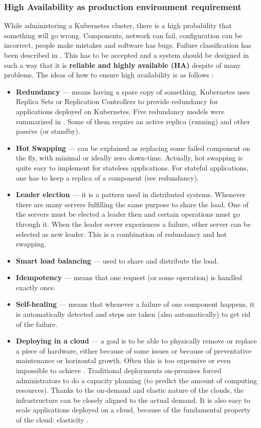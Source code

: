 \subsubsection{High Availability as production environment requirement}
While administering a Kubernetes cluster, there is a high probability that something will go wrong. Components, network can fail, configuration can be incorrect, people make mistakes and software has bugs. Failure classification has been described in \cite{article-failures}. This has to be accepted and a system should be designed in such a way that it is \textbf{reliable and highly available (HA)} despite of many problems. The ideas of how to ensure high availability is as follows \cite{book-mastering-k8s}:
\begin{itemize}
\item \textbf{Redundancy} --- means having a spare copy of something. Kubernetes uses Replica Sets or Replication Controllers to provide redundancy for applications deployed on Kubernetes. Five redundancy models were summarized in \cite{article-redundancy-models}. Some of them require an active replica (running) and other passive (or standby).
\item \textbf{Hot Swapping} --- can be explained as replacing some failed component on the fly, with minimal or ideally zero down-time. Actually, hot swapping is quite easy to implement for stateless applications. For stateful applications, one has to keep a replica of a component (see redundancy).
\item \textbf{Leader election} --- it is a pattern used in distributed systems. Whenever there are many servers fulfilling the same purpose to share the load. One of the servers must be elected a leader then and certain operations must go through it. When the leader server experiences a failure, other server can be selected as new leader. This is a combination of redundancy and hot swapping.
\item \textbf{Smart load balancing} --- used to share and distribute the load.
\item \textbf{Idempotency} --- means that one request (or some operation) is handled exactly once.
\item \textbf{Self-healing} --- means that whenever a failure of one component happens, it is automatically detected and steps are taken (also automatically) to get rid of the failure.
\item \textbf{Deploying in a cloud} --- a goal is to be able to physically remove or replace a piece of hardware, either because of some issues or because of preventative maintenance or horizontal growth. Often this is too expensive or even impossible to achieve \cite{article-failures}. Traditional deployments on-premises forced administrators to do a capacity planning (to predict the amount of computing resources). Thanks to the on-demand and elastic nature of the clouds, the infrastructure can be closely aligned to the actual demand. It is also easy to scale applications deployed on a cloud, because of the fundamental property of the cloud: elasticity \cite{article-aws-architecting}.
\end{itemize}

